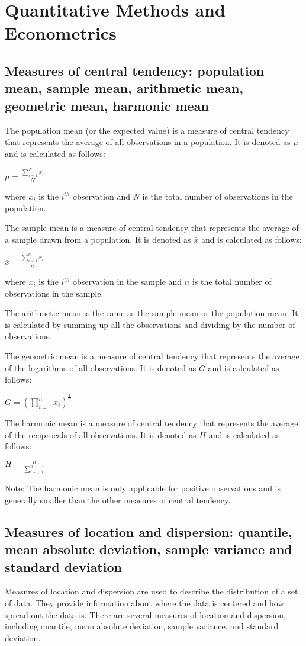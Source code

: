 \documentclass[12pt, a4paper, oneside]{article}
\begin{document}
\section{Quantitative Methods and Econometrics  }
\subsection{ Measures of central tendency: population mean, sample mean, arithmetic mean, geometric mean, harmonic mean }
The population mean (or the expected value) is a measure of central tendency that represents the average of all observations in a population. It is denoted as $\mu$ and is calculated as follows:

$\mu = \frac{\sum_{i=1}^{N}x_i}{N}$

where $x_i$ is the $i^{th}$ observation and $N$ is the total number of observations in the population.

The sample mean is a measure of central tendency that represents the average of a sample drawn from a population. It is denoted as $\bar{x}$ and is calculated as follows:

$\bar{x} = \frac{\sum_{i=1}^{n}x_i}{n}$

where $x_i$ is the $i^{th}$ observation in the sample and $n$ is the total number of observations in the sample.

The arithmetic mean is the same as the sample mean or the population mean. It is calculated by summing up all the observations and dividing by the number of observations.

The geometric mean is a measure of central tendency that represents the average of the logarithms of all observations. It is denoted as $G$ and is calculated as follows:

$G = (\prod_{i=1}^{n}x_i)^{\frac{1}{n}}$

The harmonic mean is a measure of central tendency that represents the average of the reciprocals of all observations. It is denoted as $H$ and is calculated as follows:

$H = \frac{n}{\sum_{i=1}^{n}\frac{1}{x_i}}$

Note: The harmonic mean is only applicable for positive observations and is generally smaller than the other measures of central tendency.
\subsection{ Measures of location and dispersion: quantile, mean absolute deviation, sample variance and standard deviation }
Measures of location and dispersion are used to describe the distribution of a set of data. They provide information about where the data is centered and how spread out the data is. There are several measures of location and dispersion, including quantile, mean absolute deviation, sample variance, and standard deviation.
\end{document}
